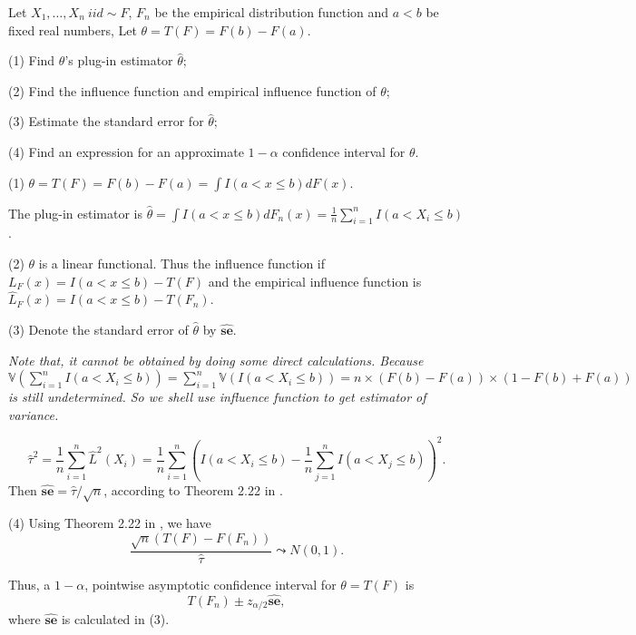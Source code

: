 \begin{problem}
    Let $X_1,\ldots,X_n~iid\sim F$, $F_n$ be the empirical distribution function and $a<b$ be fixed real numbers, Let $\theta=T(F)=F(b)-F(a)$.  

    (1) Find $\theta$'s plug-in estimator $\hat\theta$;

    (2) Find the influence function and empirical influence function of $\theta$;

    (3) Estimate the standard error for $\hat\theta$;

    (4) Find an expression for an approximate $1-\alpha$ confidence interval for $\theta$. 
\end{problem}

\begin{solution}
    (1) $\theta = T(F) = F(b) - F(a) = \int I(a < x \le b) dF(x)$.

    The plug-in estimator is $\hat{\theta} =  \int I(a < x \le b) d F_n(x) = \frac{1}{n}\sum_{i=1}^n I(a < X_i \le b)$.

    (2) $\theta$ is a linear functional. Thus the influence function if $L_F(x) = I(a < x \le b) - T(F)$ and the empirical influence function is  $\hat{L}_F(x) = I(a < x \le b) - T(F_n)$.

    (3) Denote the standard error of $\hat{\theta}$ by  $\widehat{\textbf{se}}$. 

    \small{\emph{Note that, it cannot be obtained by doing some direct calculations. Because $\mathbb{V}\left(\sum_{i=1}^n I(a < X_i \le b)\right) = \sum_{i=1}^n \mathbb{V} (I(a < X_i \le b)) = n \times (F(b)-F(a)) \times (1-F(b)+F(a))$ is still undetermined. So we shell use influence function to get estimator of variance.}}
    
    \begin{equation*}
        \hat{\tau}^2 = \frac{1}{n} \sum_{i=1}^n \hat{L}^2 (X_i) =  \frac{1}{n} \sum_{i=1}^n \left(I(a < X_i \le b) -  \frac{1}{n}\sum_{j=1}^n I(a < X_j \le b) \right)^2 .
    \end{equation*}
    Then $\widehat{\textbf{se}} = \hat{\tau}/\sqrt{n}$, according to Theorem 2.22 in \citet{Wasserman2006All}.

    (4) Using Theorem 2.22 in \citet{Wasserman2006All}, we have 
    \begin{equation*}
        \frac{\sqrt{n} ( T(F) - F(F_n))}{\hat{\tau}} \leadsto N(0, 1).
    \end{equation*}
    
    Thus, a $1-\alpha$, pointwise asymptotic confidence interval for $\theta = T(F)$ is
    \begin{equation*}
        T(F_n) \pm z_{\alpha/2} \widehat{\textbf{se}} ,
    \end{equation*}
    where $\widehat{\textbf{se}}$ is calculated in (3).
\end{solution}




